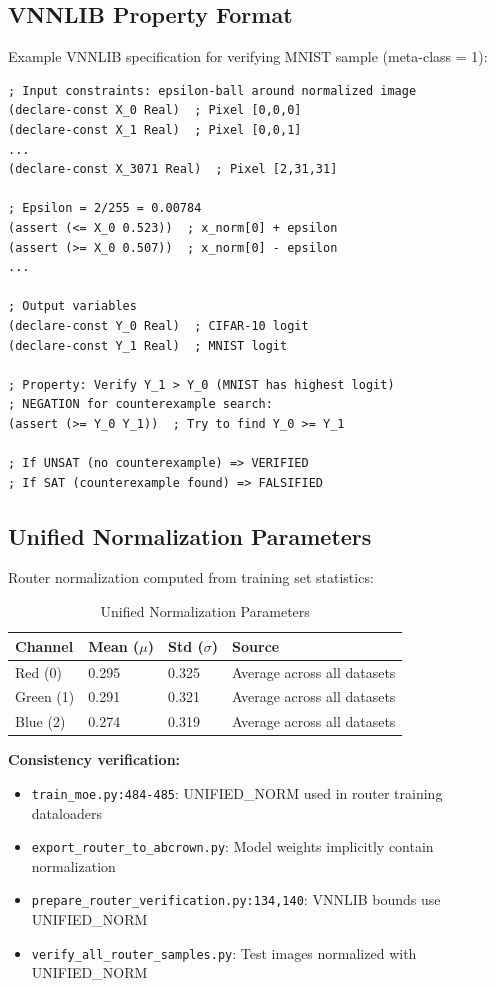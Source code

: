 \documentclass[11pt,a4paper]{article}
\begin{document}
\subsection{VNNLIB Property Format}

Example VNNLIB specification for verifying MNIST sample (meta-class = 1):

\begin{verbatim}
; Input constraints: epsilon-ball around normalized image
(declare-const X_0 Real)  ; Pixel [0,0,0]
(declare-const X_1 Real)  ; Pixel [0,0,1]
...
(declare-const X_3071 Real)  ; Pixel [2,31,31]

; Epsilon = 2/255 = 0.00784
(assert (<= X_0 0.523))  ; x_norm[0] + epsilon
(assert (>= X_0 0.507))  ; x_norm[0] - epsilon
...

; Output variables
(declare-const Y_0 Real)  ; CIFAR-10 logit
(declare-const Y_1 Real)  ; MNIST logit

; Property: Verify Y_1 > Y_0 (MNIST has highest logit)
; NEGATION for counterexample search:
(assert (>= Y_0 Y_1))  ; Try to find Y_0 >= Y_1

; If UNSAT (no counterexample) => VERIFIED
; If SAT (counterexample found) => FALSIFIED
\end{verbatim}

\subsection{Unified Normalization Parameters}

Router normalization computed from training set statistics:

\begin{table}[H]
\centering
\begin{tabular}{llll}
\toprule
\textbf{Channel} & \textbf{Mean ($\mu$)} & \textbf{Std ($\sigma$)} & \textbf{Source} \\
\midrule
Red (0) & 0.295 & 0.325 & Average across all datasets \\
Green (1) & 0.291 & 0.321 & Average across all datasets \\
Blue (2) & 0.274 & 0.319 & Average across all datasets \\
\bottomrule
\end{tabular}
\caption{Unified Normalization Parameters}
\end{table}

\textbf{Consistency verification:}
\begin{itemize}
    \item \texttt{train\_moe.py:484-485}: UNIFIED\_NORM used in router training dataloaders
    \item \texttt{export\_router\_to\_abcrown.py}: Model weights implicitly contain normalization
    \item \texttt{prepare\_router\_verification.py:134,140}: VNNLIB bounds use UNIFIED\_NORM
    \item \texttt{verify\_all\_router\_samples.py}: Test images normalized with UNIFIED\_NORM
\end{itemize}
\end{document}
